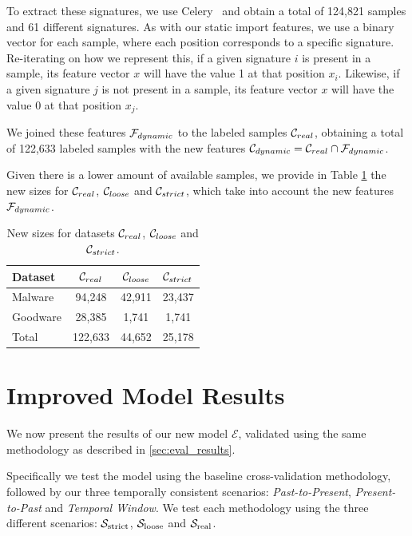 To extract these signatures, we use Celery~\cite{tool:celery} and obtain a total of 124,821 samples and 61 different signatures.
As with our static import features, we use a binary vector for each sample, where each position corresponds to a specific signature. Re-iterating on how we represent this, if a given signature $i$ is present in a sample, its feature vector $x$ will have the value 1 at that position $x_i$. Likewise, if a given signature $j$ is not present in a sample, its feature vector $x$ will have the value 0 at that position $x_j$.

\medskip

We joined these features $\mathcal{F}_{dynamic}$ to the labeled samples $\mathcal{C}_{real}$, obtaining a total of 122,633 labeled samples with the new features $\mathcal{C}_{dynamic} = \mathcal{C}_{real} \cap \mathcal{F}_{dynamic}$.

Given there is a lower amount of available samples, we provide in Table \ref{tab:dataset_sizes_improved} the new sizes for $\mathcal{C}_{real}$, $\mathcal{C}_{loose}$ and $\mathcal{C}_{strict}$, which take into account the new features $\mathcal{F}_{dynamic}$.

\begin{table}[!htb]
	\renewcommand{\arraystretch}{1.2} %
	\centering
	\begin{tabular}{lccc}
		Dataset			& $\mathcal{C}_{real}$ & $\mathcal{C}_{loose}$ & $\mathcal{C}_{strict}$	\\
		\hline
		Malware			& 94,248 & 42,911 & 23,437\\
		Goodware		& 28,385 & 1,741 & 1,741\\
		\hline
		Total			& 122,633 & 44,652 & 25,178\\
		\hline
	\end{tabular}
	\medskip
	\caption{New sizes for datasets $\mathcal{C}_{real}$, $\mathcal{C}_{loose}$ and $\mathcal{C}_{strict}$.}
	\label{tab:dataset_sizes_improved}
\end{table}

\section{Improved Model Results}
\label{section:improvements_results}

We now present the results of our new model $\mathcal{E}$, validated using the same methodology as described in \ref{sec:eval_results}.

Specifically we test the model using the baseline cross-validation methodology, followed by our three temporally consistent scenarios: \textit{Past-to-Present}, \textit{Present-to-Past} and \textit{Temporal Window}.
We test each methodology using the three different scenarios: $\mathcal{S}_{\mathrm{strict}}$, $\mathcal{S}_{\mathrm{loose}}$ and $\mathcal{S}_{\mathrm{real}}$.
\medskip

